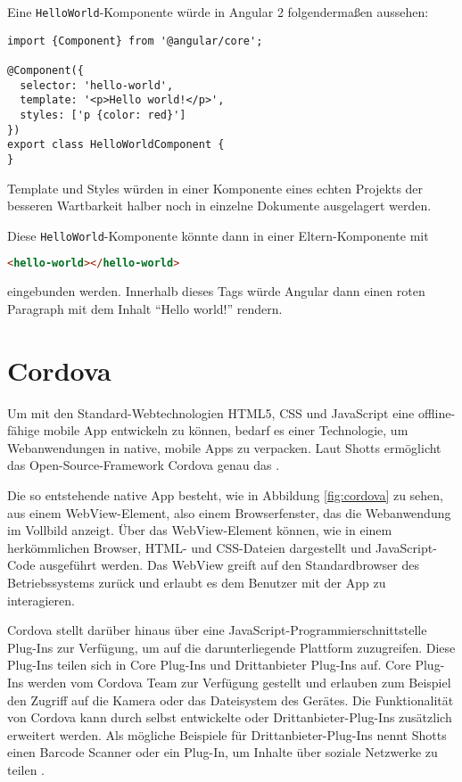 Eine \texttt{HelloWorld}-Komponente würde in Angular 2 folgendermaßen aussehen:
\begin{codebox}
\begin{lstlisting}[style=typescript]
import {Component} from '@angular/core';

@Component({
  selector: 'hello-world',
  template: '<p>Hello world!</p>',
  styles: ['p {color: red}']
})
export class HelloWorldComponent {
}
\end{lstlisting}
\end{codebox}

Template und Styles würden in einer Komponente eines echten Projekts der besseren Wartbarkeit halber noch in einzelne Dokumente ausgelagert werden.

Diese \texttt{HelloWorld}-Komponente könnte dann in einer Eltern-Komponente mit
\begin{codebox}
\begin{lstlisting}[language=HTML]
<hello-world></hello-world>
\end{lstlisting}
\end{codebox}
eingebunden werden. Innerhalb dieses Tags würde Angular dann einen roten Paragraph mit dem Inhalt "`Hello world!"' rendern.

\section{Cordova}
Um mit den Standard-Webtechnologien HTML5, CSS und JavaScript eine offline-fähige mobile App entwickeln zu können, bedarf es einer Technologie, um Webanwendungen in native, mobile Apps zu verpacken. Laut Shotts ermöglicht das Open-Source-Framework Cordova genau das \cite{shotts:phonegap}.

Die so entstehende native App besteht, wie in Abbildung \ref{fig:cordova} zu sehen, aus einem WebView-Element, also einem Browserfenster, das die Webanwendung im Vollbild anzeigt. Über das WebView-Element können, wie in einem herkömmlichen Browser, HTML- und CSS-Dateien dargestellt und JavaScript-Code ausgeführt werden. Das WebView greift auf den Standardbrowser des Betriebssystems zurück und erlaubt es dem Benutzer mit der App zu interagieren.

Cordova stellt darüber hinaus über eine JavaScript-Programmierschnittstelle Plug-Ins zur Verfügung, um auf die darunterliegende Plattform zuzugreifen. Diese Plug-Ins teilen sich in Core Plug-Ins und Drittanbieter Plug-Ins auf. Core Plug-Ins werden vom Cordova Team zur Verfügung gestellt und erlauben zum Beispiel den Zugriff auf die Kamera oder das Dateisystem des Gerätes. Die Funktionalität von Cordova kann durch selbst entwickelte oder Drittanbieter-Plug-Ins zusätzlich erweitert werden. Als mögliche Beispiele für Drittanbieter-Plug-Ins nennt Shotts einen Barcode Scanner oder ein Plug-In, um Inhalte über soziale Netzwerke zu teilen \cite{shotts:phonegap}.

